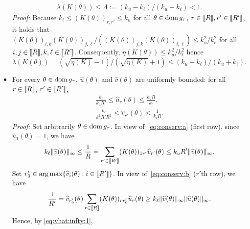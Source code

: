 \begin{itemize}
\begin{align}
    \lambda(K(\theta))
    \leq \Lambda := (k_{u} - k_{\ell})/(k_{u}+k_{\ell}) < 1.
   \end{align}
   \textit{Proof:} Because $k_{\ell} \leq (K(\theta))_{r,r'} \leq k_{u}$ for all
   $\theta \in \operatorname{dom} g_{\tau}$,
   $r\in \llbracket R \rrbracket, r'\in\llbracket R' \rrbracket$, it holds that
   $(K(\theta))_{i,k} (K(\theta))_{j,\ell}/((K(\theta))_{j,k} (K(\theta))_{i, \ell} )
   \leq k^{2}_{u}/k^{2}_{\ell}$ for all
   $ i, j \in \llbracket R \rrbracket, k, \ell \in \llbracket R' \rrbracket$.
   Consequently, $\eta(K(\theta)) \leq k^{2}_{u}/k^{2}_{\ell}$ hence
   $\lambda(K(\theta))= (\sqrt{\eta(K)} -1)/(\sqrt{\eta(K)}+1) \leq (k_{u}
   -k_{\ell})/(k_{u}+k_{\ell})$.
 \item  For  every  $\theta  \in  \operatorname{dom}  g_{\tau}$,  $\widehat{u}(\theta)$  and
   $\widehat{v}(\theta)$  are uniformly  bounded: for  all $r  \in\llbracket R  \rrbracket$,
   $r' \in\llbracket R' \rrbracket$,
   \begin{align}
     \label{eq:uu:bound}
    \frac{k_{\ell}}{ k_{u} R'} \leq \widehat{u}_r(\theta) \leq
     \frac{k_{u}R}{k_{\ell}}, \\
    \label{eq:vv:bound}
     \frac{k_{\ell}}{k^{2}_{u}R'R^2}     \leq     \widehat{v}_{r'}(\theta)     \leq
     \frac{1}{k_{\ell}R }.
   \end{align}
   \textit{Proof:}  Set  arbitrarily  $\theta  \in \operatorname{dom}  g_{\tau}$.   In  view
   of~\eqref{eq:conserv:a} (first  row), since $\widehat{u}_{1}(\theta)  = 1$,
   we have
   \begin{equation}
     \label{eq:vhat:infty:1}
     k_{\ell} \| \widehat{v}(\theta)\|_{\infty} \leq \frac{1}{R} = \sum_{r' \in
       \llbracket R' \rrbracket} (K(\theta))_{1r'} \widehat{v}_{r'}(\theta) \leq
     k_{u}R' \|\widehat{v}(\theta)\|_{\infty}.
   \end{equation}
   Set $r_{0}'\in \arg\max  \{\widehat{v}_i(\theta): i \in \llbracket R'  \rrbracket \}$. In
   view of~\eqref{eq:conserv:b} ($r'$th row), we have
   \begin{equation*}
     \frac{1}{R'} = \widehat{v}_{r_{0}'}(\theta) \sum_{r \in \llbracket R
       \rrbracket} (K(\theta))_{rr_{0}'} \widehat{u}_r(\theta) \geq k_{\ell}
     \|\widehat{v}(\theta)\|_{\infty} \|\widehat{u}(\theta)\|_{\infty}.
   \end{equation*}
   Hence, by \eqref{eq:vhat:infty:1},

\end{itemize}
